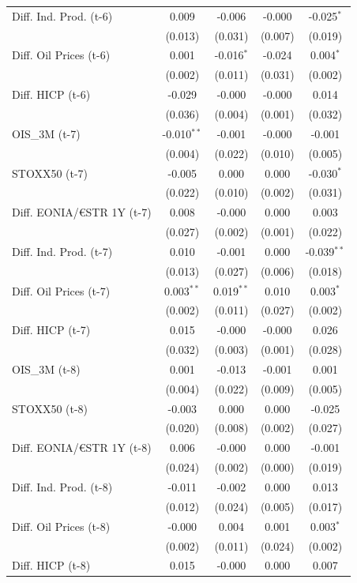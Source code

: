 \begin{longtable}[t]{lcccc}
Diff. Ind. Prod. (t-6) & 0.009 & -0.006 & -0.000 & -0.025$^{*}$\\
 & (0.013) & (0.031) & (0.007) & (0.019)\\
Diff. Oil Prices (t-6) & 0.001 & -0.016$^{*}$ & -0.024 & 0.004$^{*}$\\
 & (0.002) & (0.011) & (0.031) & (0.002)\\
Diff. HICP (t-6) & -0.029 & -0.000 & -0.000 & 0.014\\
 & (0.036) & (0.004) & (0.001) & (0.032)\\
OIS\_3M (t-7) & -0.010$^{**}$ & -0.001 & -0.000 & -0.001\\
 & (0.004) & (0.022) & (0.010) & (0.005)\\
STOXX50 (t-7) & -0.005 & 0.000 & 0.000 & -0.030$^{*}$\\
 & (0.022) & (0.010) & (0.002) & (0.031)\\
Diff. EONIA/€STR 1Y (t-7) & 0.008 & -0.000 & 0.000 & 0.003\\
 & (0.027) & (0.002) & (0.001) & (0.022)\\
Diff. Ind. Prod. (t-7) & 0.010 & -0.001 & 0.000 & -0.039$^{**}$\\
 & (0.013) & (0.027) & (0.006) & (0.018)\\
Diff. Oil Prices (t-7) & 0.003$^{**}$ & 0.019$^{**}$ & 0.010 & 0.003$^{*}$\\
 & (0.002) & (0.011) & (0.027) & (0.002)\\
Diff. HICP (t-7) & 0.015 & -0.000 & -0.000 & 0.026\\
 & (0.032) & (0.003) & (0.001) & (0.028)\\
OIS\_3M (t-8) & 0.001 & -0.013 & -0.001 & 0.001\\
 & (0.004) & (0.022) & (0.009) & (0.005)\\
STOXX50 (t-8) & -0.003 & 0.000 & 0.000 & -0.025\\
 & (0.020) & (0.008) & (0.002) & (0.027)\\
Diff. EONIA/€STR 1Y (t-8) & 0.006 & -0.000 & 0.000 & -0.001\\
 & (0.024) & (0.002) & (0.000) & (0.019)\\
Diff. Ind. Prod. (t-8) & -0.011 & -0.002 & 0.000 & 0.013\\
 & (0.012) & (0.024) & (0.005) & (0.017)\\
Diff. Oil Prices (t-8) & -0.000 & 0.004 & 0.001 & 0.003$^{*}$\\
 & (0.002) & (0.011) & (0.024) & (0.002)\\
Diff. HICP (t-8) & 0.015 & -0.000 & 0.000 & 0.007\\

\end{longtable}
